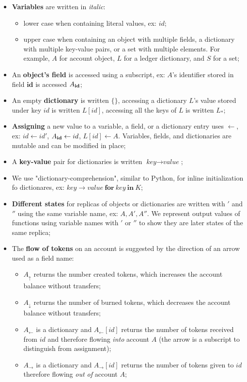 \documentclass[9pt]{article}   	%
\begin{document}
\begin{itemize}
	\item \textbf{Variables} are written in \textit{italic}:
		\begin{itemize}
			\item  lower case when containing literal values, ex: $id$;
			\item upper case when containing an object with multiple fields, a dictionary with multiple key-value pairs, or a set with multiple elements. For example, $A$ for account object, $L$ for a ledger dictionary, and $S$ for a set;
		\end{itemize}
	\item An \textbf{object's field} is accessed using a subscript, ex: $A$'s identifier stored in field $\textbf{id}$ is accessed $A_{\scriptsize \textbf{id}}$;
	\item An empty \textbf{dictionary} is written $\{\}$, accessing a dictionary $L$'s value stored under key $id$ is written $L[id]$, accessing all the keys of $L$ is written $L_*$;
	\item \textbf{Assigning} a new value to a variable, a field, or a dictionary entry uses $\leftarrow$, ex: $id \leftarrow id'$, $A_{\scriptsize\textbf{id}} \leftarrow id$, $L[id] \leftarrow A$. Variables, fields, and dictionaries are mutable and can be modified in place;
	 \item A \textbf{key-value} pair for dictionaries is written $\textit{key} \rightarrow \textit{value}$;
	 \item We use "dictionary-comprehension", similar to Python, for inline initialization fo dictionares, ex: ${ \textit{key} \rightarrow \textit{value} ~\textbf{for}~ \textit{key} ~\textbf{in}~ K }$;
	\item \textbf{Different states} for replicas of objects or dictionaries are written with $'$ and $''$ using the same variable name, ex: $A, A', A''$. We represent output values of functions using variable names with $'$ or $''$ to show they are later states of the same replica;
	\item The  \textbf{flow of tokens} on an account is suggested by the direction of an arrow used as a field name: 
		\begin{itemize}
			\item $A_\uparrow$ returns the number created tokens, which increases the account balance without transfers;
			\item $A_\downarrow$ returns the number of burned tokens, which decreases the account balance without transfers;
			\item $A_{\leftarrow}$ is a dictionary and $A_{\leftarrow}[id]$ returns the number of tokens received from $id$ and therefore flowing \textit{into} account $A$ (the arrow is a subscript to distinguish from assignment);
			\item $A_{\rightarrow}$ is a dictionary and $A_{\rightarrow}[id]$ returns the number of tokens given to $id$ therefore flowing \textit{out of} account $A$;
		\end{itemize}
\end{itemize}
\end{document}
